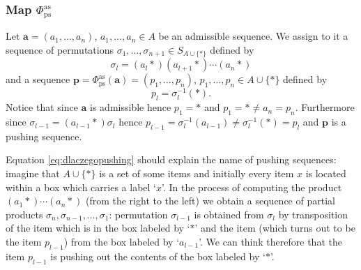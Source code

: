 \documentclass[12pt,dvips]{amsart}
\numberwithin{equation}{section} \numberwithin{figure}{section}
\theoremstyle{plain}
\theoremstyle{definition}
\theoremstyle{remark}
\newcommand{\aaa}{{\mathbf{a}}}
\newcommand{\ppp}{{\mathbf{p}}}
\newcommand{\Sn}[1]{{{S}}_{#1}}
\newcommand{\xtra}{\ast}
\newcommand{\fpsas}{\Phi^{\ps}_{\adm}}
\newcommand{\fasps}{\Phi^{\adm}_{\ps}}
\DeclareMathOperator{\adm}{as}
\DeclareMathOperator{\ps}{ps}
\begin{document}
%




\subsubsection{Map $\fasps$} \label{subsubsec:fasps} Let
$\aaa=(a_1,\dots,a_n)$, $a_1,\dots,a_n\in A$ be an admissible
sequence. We assign to it a sequence of permutations
$\sigma_1,\dots,\sigma_{n+1}\in\Sn{A\cup\{\xtra\}}$ defined by
\begin{equation}
\sigma_l= (a_l \xtra) (a_{l+1} \xtra) \cdots (a_n \xtra)
\label{eq:slynnesigma}
\end{equation}
and a sequence $\ppp=\fasps(\aaa)= (p_1,\dots,p_n)$,
$p_1,\dots,p_n\in A\cup\{\xtra\}$ defined by
\begin{equation}
p_l= \sigma_l^{-1}(\xtra). \label{eq:dlaczegopushing}
\end{equation}
Notice that since $\aaa$ is admissible hence $p_1=\xtra$ and
$p_1=\xtra\neq a_n=p_n$. Furthermore since $\sigma_{l-1}=(a_{l-1}
\xtra) \sigma_l$ hence $p_{l-1}=\sigma_l^{-1}(a_{l-1}) \neq
\sigma_l^{-1}(\xtra)=p_l$ and $\ppp$ is a pushing sequence.

Equation \eqref{eq:dlaczegopushing} should explain the name of
pushing sequences: imagine that $A\cup\{\xtra\}$ is a set of some
items and initially every item $x$ is located within a box which
carries a label `$x$'. In the process of computing the product $(a_1
\xtra) \cdots (a_n \xtra)$ (from the right to the left) we obtain a
sequence of partial products $\sigma_n,\sigma_{n-1},\dots,\sigma_1$:
permutation $\sigma_{l-1}$ is obtained from $\sigma_l$ by
transposition of the item which is in the box labeled by `$\xtra$'
and the item (which turns out to be the item $p_{l-1}$) from the box
labeled by `$a_{l-1}$'. We can think therefore that the item
$p_{l-1}$ is pushing out the contents of the box labeled by
`$\xtra$'.
\end{document}
